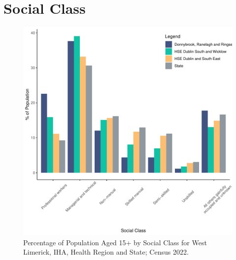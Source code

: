 \documentclass{article}
\begin{document}
\section{Social Class}\label{sect:SC}
\begin{figure}[H]
	\centering
	\includegraphics[width = 140mm]{../figures/SocialClassED.pdf}
	\caption{Percentage of Population Aged 15+ by Social Class for West Limerick, IHA, Health Region and State; Census 2022.}
	\label{fig:vbnv}
	\end{figure}
\end{document}
